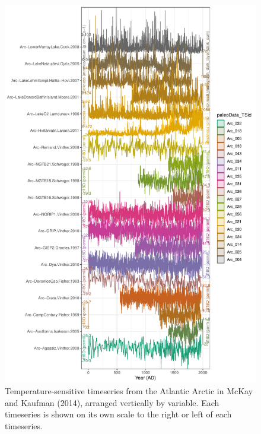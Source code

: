 \documentclass[gchron, manuscript]{copernicus}
\begin{document}
\begin{figure}
\includegraphics[width=12cm]{geoChronR-paper_files/figure-latex/timeseries-stack-1} \caption{Temperature-sensitive timeseries from the Atlantic Arctic in McKay and Kaufman (2014), arranged vertically by variable. Each timeseries is shown on its own scale to the right or left of each timeseries.}\label{fig:timeseries-stack-1}
\end{figure}
\end{document}
